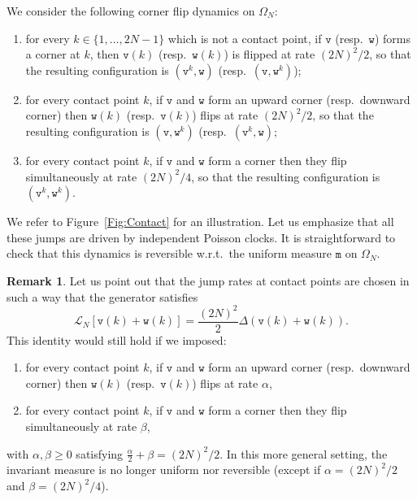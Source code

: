 \documentclass[10pt]{amsart}
\theoremstyle{definition}\newtheorem{defi}[theo]{Definition}\newtheorem{rema}[theo]{Remark}\newtheorem{exam}[theo]{Example}\newtheorem{exem}[theo]{Example}\newtheorem{nota}[theo]{Notation}
\theoremstyle{plain}
\newcommand{\ttv}{\mathtt{v}}
\newcommand{\ttw}{\mathtt{w}}
\newcommand{\ttm}{\mathtt{m}}
\newcommand{\cL}{\mathcal{L}}
\begin{document}
We consider the following corner flip dynamics on $\Omega_N$:
\begin{enumerate}
\item for every $k\in \{1,\dots,2N-1\}$ which is not a contact point, if $\ttv$ (resp.~$\ttw$) forms a corner at $k$, then $\ttv(k)$ (resp.~$\ttw(k)$) is flipped at rate $(2N)^2/2$, so that the resulting configuration is $(\ttv^k,\ttw)$ (resp.~$(\ttv,\ttw^k)$);
\item for every contact point $k$, if $\ttv$ and $\ttw$ form an upward corner (resp.~downward corner) then $\ttw(k)$ (resp.~$\ttv(k)$) flips at rate $(2N)^2/2$, so that the resulting configuration is $(\ttv,\ttw^k)$ (resp.~$(\ttv^k,\ttw)$;
\item for every contact point $k$, if $\ttv$ and $\ttw$ form a corner then they flip simultaneously at rate $(2N)^2/4$, so that the resulting configuration is $(\ttv^k,\ttw^k)$.
\end{enumerate}
We refer to Figure~\ref{Fig:Contact} for an illustration. Let us emphasize that all these jumps are driven by independent Poisson clocks. It is straightforward to check that this dynamics is reversible w.r.t.~the uniform measure $\ttm$ on $\Omega_N$.

\begin{rema}\label{rem:letus}
Let us point out that the jump rates at contact points are chosen in such a way that the generator satisfies
\[
\cL_N[\ttv(k)+\ttw(k)] = \frac{(2N)^2}{2} \Delta (\ttv(k) + \ttw(k)).
\]
This identity would still hold if we imposed:
\begin{enumerate}
\item for every contact point $k$, if $\ttv$ and $\ttw$ form an upward corner (resp.~downward corner) then $\ttw(k)$ (resp.~$\ttv(k)$) flips at rate $\alpha$,
\item for every contact point $k$, if $\ttv$ and $\ttw$ form a corner then they flip simultaneously at rate $\beta$,
\end{enumerate}
with $\alpha,\beta \ge 0$ satisfying $\frac{\alpha}{2} + \beta = (2N)^2/2$. In this more general setting, the invariant measure is no longer uniform nor reversible (except if $\alpha = (2N)^2/2$ and $\beta=(2N)^2/4$).
\end{rema}
\end{document}

